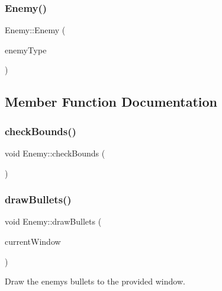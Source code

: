 \subsubsection{\texorpdfstring{Enemy()}{Enemy()}\hspace{0.1cm}{\footnotesize\ttfamily [2/2]}}
{\footnotesize\ttfamily Enemy\+::\+Enemy (\begin{DoxyParamCaption}\item[{\hyperlink{_enemy_8h_ac3e413a86119db4b031458c7259e268e}{Enemy\+Type}}]{enemy\+Type }\end{DoxyParamCaption})\hspace{0.3cm}{\ttfamily [private]}}



\subsection{Member Function Documentation}
\mbox{\label{class_enemy_ab446b847a18890227905674734f7017e}} 
\subsubsection{\texorpdfstring{check\+Bounds()}{checkBounds()}}
{\footnotesize\ttfamily void Enemy\+::check\+Bounds (\begin{DoxyParamCaption}{ }\end{DoxyParamCaption})\hspace{0.3cm}{\ttfamily [private]}}

\mbox{\label{class_enemy_ac0e1068fc766428d69d55b18e0fce0ca}} 
\subsubsection{\texorpdfstring{draw\+Bullets()}{drawBullets()}}
{\footnotesize\ttfamily void Enemy\+::draw\+Bullets (\begin{DoxyParamCaption}\item[{sf\+::\+Render\+Window $\ast$}]{current\+Window }\end{DoxyParamCaption})}



Draw the enemy\textquotesingle{}s bullets to the provided window. 


